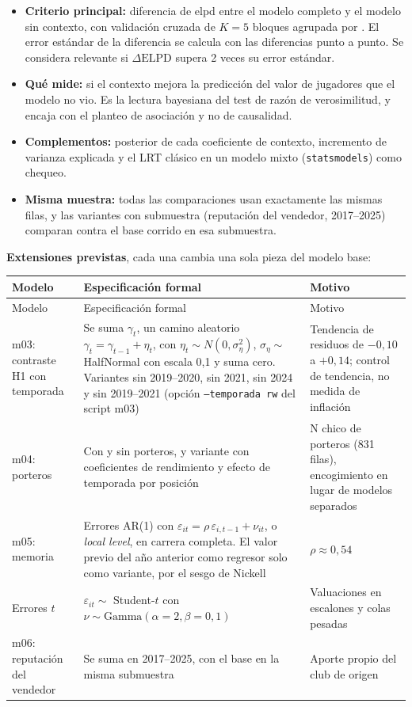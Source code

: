 \documentclass[11pt,a4paper]{article}
\newcommand{\var}[1]{\texttt{\detokenize{#1}}}
\newcommand{\lead}[1]{\textbf{#1}}
\begin{document}
\begin{itemize}
  \item \lead{Criterio principal:} diferencia de elpd entre el modelo completo y el modelo sin contexto, con validación cruzada de $K=5$ bloques agrupada por \var{player_id}. El error estándar de la diferencia se calcula con las diferencias punto a punto. Se considera relevante si $\Delta\text{ELPD}$ supera 2 veces su error estándar.
  \item \lead{Qué mide:} si el contexto mejora la predicción del valor de jugadores que el modelo no vio. Es la lectura bayesiana del test de razón de verosimilitud, y encaja con el planteo de asociación y no de causalidad.
  \item \lead{Complementos:} posterior de cada coeficiente de contexto, incremento de varianza explicada y el LRT clásico en un modelo mixto (\texttt{statsmodels}) como chequeo.
  \item \lead{Misma muestra:} todas las comparaciones usan exactamente las mismas filas, y las variantes con submuestra (reputación del vendedor, 2017--2025) comparan contra el base corrido en esa submuestra.
\end{itemize}

\lead{Extensiones previstas}, cada una cambia una sola pieza del modelo base:

{\small
\begin{longtable}{@{}>{\raggedright\arraybackslash}p{2.8cm}>{\raggedright\arraybackslash}p{7.2cm}>{\raggedright\arraybackslash}p{4.5cm}@{}}
\toprule
Modelo & Especificación formal & Motivo \\
\midrule
\endfirsthead
\toprule
Modelo & Especificación formal & Motivo \\
\midrule
\endhead
\bottomrule
\endfoot
m03: contraste H1 con temporada & Se suma $\gamma_t$, un camino aleatorio $\gamma_t = \gamma_{t-1} + \eta_t$, con $\eta_t \sim N(0, \sigma_\eta^2)$, $\sigma_\eta \sim$ HalfNormal con escala 0,1 y suma cero. Variantes sin 2019--2020, sin 2021, sin 2024 y sin 2019--2021 (opción \texttt{--temporada rw} del script m03) & Tendencia de residuos de $-0{,}10$ a $+0{,}14$; control de tendencia, no medida de inflación \\
\addlinespace
m04: porteros & Con y sin porteros, y variante con coeficientes de rendimiento y efecto de temporada por posición & N chico de porteros (831 filas), encogimiento en lugar de modelos separados \\
\addlinespace
m05: memoria & Errores AR(1) con $\varepsilon_{it} = \rho\,\varepsilon_{i,t-1} + \nu_{it}$, o \emph{local level}, en carrera completa. El valor previo del año anterior como regresor solo como variante, por el sesgo de Nickell & $\rho \approx 0{,}54$ \\
\addlinespace
Errores $t$ & $\varepsilon_{it} \sim$ Student-$t$ con $\nu \sim \text{Gamma}(\alpha = 2, \beta = 0{,}1)$ & Valuaciones en escalones y colas pesadas \\
\addlinespace
m06: reputación del vendedor & Se suma \var{reputacion_vendedor} en 2017--2025, con el base en la misma submuestra & Aporte propio del club de origen \\
\end{longtable}
}
\end{document}
